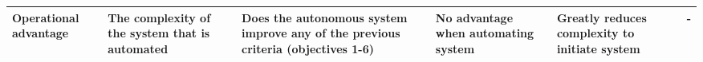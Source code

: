 \begin{table}[]
{\begin{tabular}{|p{2cm}|p{4cm}|p{4cm}|p{4cm}|p{4cm}|r|}
Operational advantage & The complexity of the system that is automated                                                                                                         & Does the autonomous system improve any of the previous criteria (objectives 1-6) & No advantage when automating system                            & Greatly reduces complexity to initiate system                                        & -                  \\ \hline
\end{tabular}%
}
\end{table}